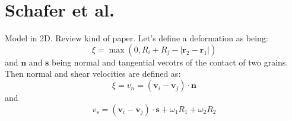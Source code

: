 \documentclass[10pt,a4paper]{article}
\begin{document}
\section{Schafer et al. \cite{sw95, schafer96}}
Model in 2D. Review kind of paper.
Let's define a deformation as being:
\begin{equation}
 \xi = \max(0, R_i + R_j - |\mathbf{r}_2 - \mathbf{r}_1|)
\end{equation}
and $\mathbf{n}$ and $\mathbf{s}$ being normal and tangential vecotrs of the contact of two grains.
Then normal and shear velocities are defined as:
\begin{equation}
 \dot{\xi} = v_n = (\mathbf{v}_i - \mathbf{v}_j) \cdot \mathbf{n}
\end{equation}
and
\begin{equation}
 v_s = (\mathbf{v}_i - \mathbf{v}_j) \cdot \mathbf{s} + \omega_1 R_1 + \omega_2 R_2
\end{equation}
\end{document}
